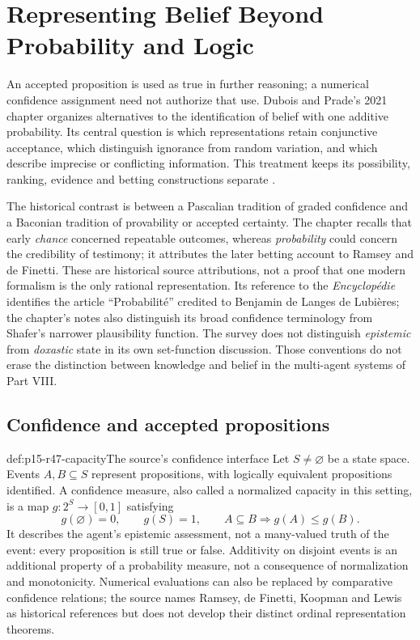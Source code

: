 \chapter{Representing Belief Beyond Probability and Logic}
\label{sec:p15-rationality-4-7}

An accepted proposition is used as true in further reasoning; a numerical
confidence assignment need not authorize that use. Dubois and Prade's 2021
chapter organizes alternatives to the identification of belief with one
additive probability. Its central question is which representations retain
conjunctive acceptance, which distinguish ignorance from random variation,
and which describe imprecise or conflicting information. This treatment
keeps its possibility, ranking, evidence and betting constructions separate
\cite[pp.~305--316]{DuboisPrade2021RepresentingBelief}.

The historical contrast is between a Pascalian tradition of graded
confidence and a Baconian tradition of provability or accepted certainty.
The chapter recalls that early \emph{chance} concerned repeatable outcomes,
whereas \emph{probability} could concern the credibility of testimony; it
attributes the later betting account to Ramsey and de Finetti. These are
historical source attributions, not a proof that one modern formalism is the
only rational representation. Its reference to the \emph{Encyclop\'edie}
identifies the article ``Probabilit\'e'' credited to Benjamin de Langes de
Lubi\`eres; the chapter's notes also distinguish its broad confidence
terminology from Shafer's narrower plausibility function. The survey does
not distinguish \emph{epistemic} from \emph{doxastic} state in its own
set-function discussion. Those conventions do not erase the distinction
between knowledge and belief in the multi-agent systems of Part VIII.

\section{Confidence and accepted propositions}
\label{sec:p15-r47-confidence}

\begin{hbdefinition}{def:p15-r47-capacity}{The source's confidence interface}
Let \(S\ne\varnothing\) be a state space. Events \(A,B\subseteq S\)
represent propositions, with logically equivalent propositions identified.
A confidence measure, also called a normalized capacity in this setting,
is a map \(g:2^S\to[0,1]\) satisfying
\[
 g(\varnothing)=0,\qquad g(S)=1,\qquad
 A\subseteq B\Longrightarrow g(A)\leq g(B).
\]
It describes the agent's epistemic assessment, not a many-valued truth of
the event: every proposition is still true or false. Additivity on disjoint
events is an additional property of a probability measure, not a
consequence of normalization and monotonicity. Numerical evaluations can
also be replaced by comparative confidence relations; the source names
Ramsey, de Finetti, Koopman and Lewis as historical references but does not
develop their distinct ordinal representation theorems.
\end{hbdefinition}


